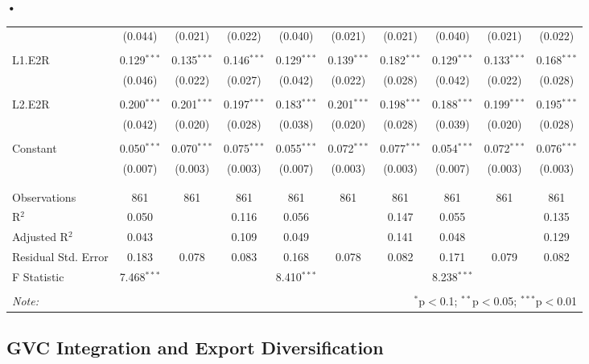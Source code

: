 \textbf{\textbf{•}}\documentclass[a4paper]{article}
\begin{document}
\begin{table}[!htbp]
{\begin{tabular}{@{\extracolsep{5pt}}lccccccccc}
  & (0.044) & (0.021) & (0.022) & (0.040) & (0.021) & (0.021) & (0.040) & (0.021) & (0.022) \\ 
  & & & & & & & & & \\ 
 L1.E2R & 0.129$^{***}$ & 0.135$^{***}$ & 0.146$^{***}$ & 0.129$^{***}$ & 0.139$^{***}$ & 0.182$^{***}$ & 0.129$^{***}$ & 0.133$^{***}$ & 0.168$^{***}$ \\ 
  & (0.046) & (0.022) & (0.027) & (0.042) & (0.022) & (0.028) & (0.042) & (0.022) & (0.028) \\ 
  & & & & & & & & & \\ 
 L2.E2R & 0.200$^{***}$ & 0.201$^{***}$ & 0.197$^{***}$ & 0.183$^{***}$ & 0.201$^{***}$ & 0.198$^{***}$ & 0.188$^{***}$ & 0.199$^{***}$ & 0.195$^{***}$ \\ 
  & (0.042) & (0.020) & (0.028) & (0.038) & (0.020) & (0.028) & (0.039) & (0.020) & (0.028) \\ 
  & & & & & & & & & \\ 
 Constant & 0.050$^{***}$ & 0.070$^{***}$ & 0.075$^{***}$ & 0.055$^{***}$ & 0.072$^{***}$ & 0.077$^{***}$ & 0.054$^{***}$ & 0.072$^{***}$ & 0.076$^{***}$ \\ 
  & (0.007) & (0.003) & (0.003) & (0.007) & (0.003) & (0.003) & (0.007) & (0.003) & (0.003) \\ 
  & & & & & & & & & \\ 
\hline \\[-1.8ex] 
Observations & 861 & 861 & 861 & 861 & 861 & 861 & 861 & 861 & 861 \\ 
R$^{2}$ & 0.050 &  & 0.116 & 0.056 &  & 0.147 & 0.055 &  & 0.135 \\ 
Adjusted R$^{2}$ & 0.043 &  & 0.109 & 0.049 &  & 0.141 & 0.048 &  & 0.129 \\ 
Residual Std. Error & 0.183 & 0.078 & 0.083 & 0.168 & 0.078 & 0.082 & 0.171 & 0.079 & 0.082 \\ 
F Statistic & 7.468$^{***}$ &  &  & 8.410$^{***}$ &  &  & 8.238$^{***}$ &  &  \\ 
\hline 
\hline \\[-1.8ex] 
\textit{Note:}  & \multicolumn{9}{r}{$^{*}$p$<$0.1; $^{**}$p$<$0.05; $^{***}$p$<$0.01} \\ 
\end{tabular} 
}
\end{table} 
\FloatBarrier

\subsection{GVC Integration and Export Diversification}
\end{document}

